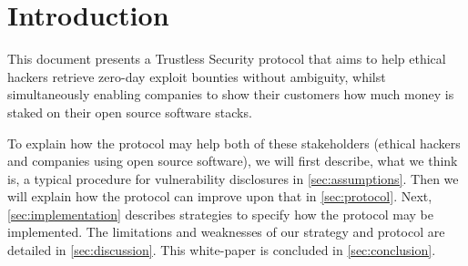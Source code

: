 \section{Introduction}
\label{sec:introduction}
This document presents a Trustless Security protocol that aims to help ethical hackers retrieve zero-day exploit bounties without ambiguity, whilst simultaneously enabling companies to show their customers how much money is staked on their open source software stacks.


To explain how the protocol may help both of these stakeholders (ethical hackers and companies using open source software), we will first describe, what we think is, a typical procedure for vulnerability disclosures in \cref{sec:assumptions}. Then we will explain how the protocol can improve upon that in \cref{sec:protocol}. Next, \cref{sec:implementation} describes strategies to specify how the protocol may be implemented. The limitations and weaknesses of our strategy and protocol are detailed in \cref{sec:discussion}. This white-paper is concluded in \cref{sec:conclusion}.